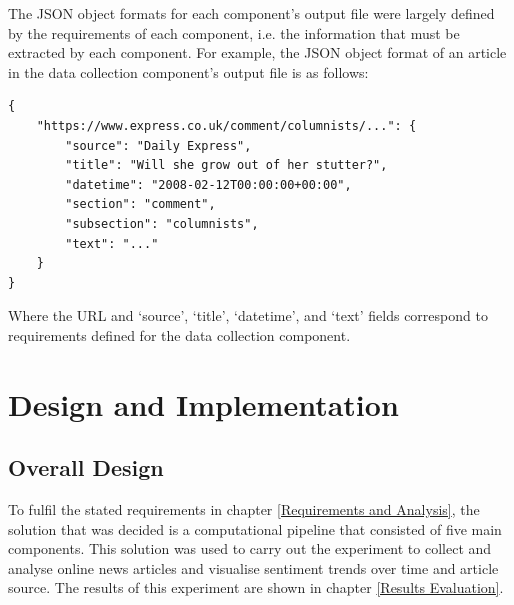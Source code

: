 \documentclass{report}
\begin{document}
The JSON object formats for each component's output file were largely defined by the requirements of each component, i.e. the information that must be extracted by each component.
For example, the JSON object format of an article in the data collection component's output file is as follows:
\begin{lstlisting}
{
	"https://www.express.co.uk/comment/columnists/...": {
		"source": "Daily Express",
		"title": "Will she grow out of her stutter?",
		"datetime": "2008-02-12T00:00:00+00:00",
		"section": "comment",
		"subsection": "columnists",
		"text": "..."
	}
}
\end{lstlisting}
Where the URL and `source', `title', `datetime', and `text' fields correspond to requirements defined for the data collection component.



\chapter{Design and Implementation} \label{Design and Implementation} %

\section{Overall Design} \label{Overall Design}

To fulfil the stated requirements in chapter \ref{Requirements and Analysis}, the solution that was decided is a computational pipeline that consisted of five main components.
This solution was used to carry out the experiment to collect and analyse online news articles and visualise sentiment trends over time and article source.
The results of this experiment are shown in chapter \ref{Results Evaluation}.
\end{document}
